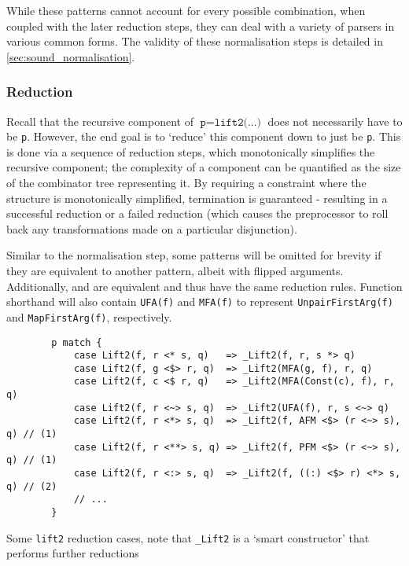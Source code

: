 While these patterns cannot account for every possible combination, when coupled with the later reduction steps, they can deal with a variety of parsers in various common forms.
The validity of these normalisation steps is detailed in \autoref{sec:sound_normalisation}.

\subsubsection*{Reduction}
Recall that the recursive component of $\texttt{p} = \texttt{lift2(...)}$ does not necessarily have to be \texttt{p}.
However, the end goal is to `reduce' this component down to just be \texttt{p}.
This is done via a sequence of reduction steps, which monotonically simplifies the recursive component; the complexity of a component can be quantified as the size of the combinator tree representing it.
By requiring a constraint where the structure is monotonically simplified, termination is guaranteed - resulting in a successful reduction or a failed reduction (which causes the preprocessor to roll back any transformations made on a particular disjunction).

Similar to the normalisation step, some patterns will be omitted for brevity if they are equivalent to another pattern, albeit with flipped arguments.
Additionally, \texttt{\apl} and \texttt{\multl} are equivalent and thus have the same reduction rules.
Function shorthand will also contain \texttt{UFA(f)} and \texttt{MFA(f)} to represent \texttt{UnpairFirstArg(f)} and \texttt{MapFirstArg(f)}, respectively.

\begin{capminted}
    \begin{verbatim}
        p match {
            case Lift2(f, r <* s, q)   => _Lift2(f, r, s *> q)
            case Lift2(f, g <$> r, q)  => _Lift2(MFA(g, f), r, q)
            case Lift2(f, c <$ r, q)   => _Lift2(MFA(Const(c), f), r, q)
            case Lift2(f, r <~> s, q)  => _Lift2(UFA(f), r, s <~> q)
            case Lift2(f, r <*> s, q)  => _Lift2(f, AFM <$> (r <~> s), q) // (1)
            case Lift2(f, r <**> s, q) => _Lift2(f, PFM <$> (r <~> s), q) // (1)
            case Lift2(f, r <:> s, q)  => _Lift2(f, ((:) <$> r) <*> s, q) // (2)
            // ...
        }
    \end{verbatim}
    \vspace{-0.5\baselineskip}
    \caption{Some \texttt{lift2} reduction cases, note that \texttt{\_Lift2} is a `smart constructor' that performs further reductions}
    \label{lst:scala_reduction}
\end{capminted}

